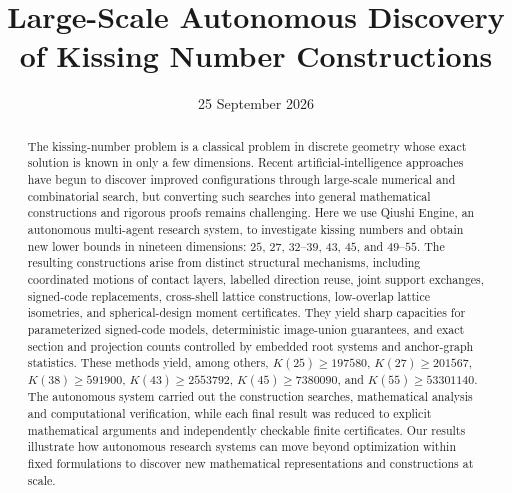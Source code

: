 \documentclass[11pt,reqno]{amsart}
\title[Autonomous discovery of kissing constructions]{Large-Scale Autonomous Discovery of Kissing Number Constructions}
\date{25 September 2026}
\begin{document}
\begin{abstract}
The kissing-number problem is a classical problem in discrete geometry
whose exact solution is known in only a few dimensions. Recent
artificial-intelligence approaches have begun to discover improved
configurations through large-scale numerical and combinatorial search,
but converting such searches into general mathematical constructions and
rigorous proofs remains challenging. Here we use Qiushi Engine, an autonomous
multi-agent research system, to investigate kissing numbers and obtain
new lower bounds in nineteen dimensions: $25$, $27$, $32$--$39$, $43$,
$45$, and $49$--$55$. The resulting constructions arise from distinct
structural mechanisms, including coordinated motions of contact layers,
labelled direction reuse, joint support exchanges, signed-code
replacements, cross-shell lattice constructions, low-overlap lattice
isometries, and spherical-design moment certificates. They yield sharp
capacities for parameterized signed-code models, deterministic image-union
guarantees, and exact section and projection counts controlled by embedded
root systems and anchor-graph statistics. These methods
yield, among others, $K(25)\ge197580$, $K(27)\ge201567$,
$K(38)\ge591900$, $K(43)\ge2553792$, $K(45)\ge7380090$, and
$K(55)\ge53301140$. The autonomous system carried out the construction
searches, mathematical analysis and computational verification, while
each final result was reduced to explicit mathematical arguments and
independently checkable finite certificates. Our results illustrate how
autonomous research systems can move beyond optimization within fixed
formulations to discover new mathematical representations and
constructions at scale.
\end{abstract}
\maketitle












\appendix




\clearpage


\end{document}

